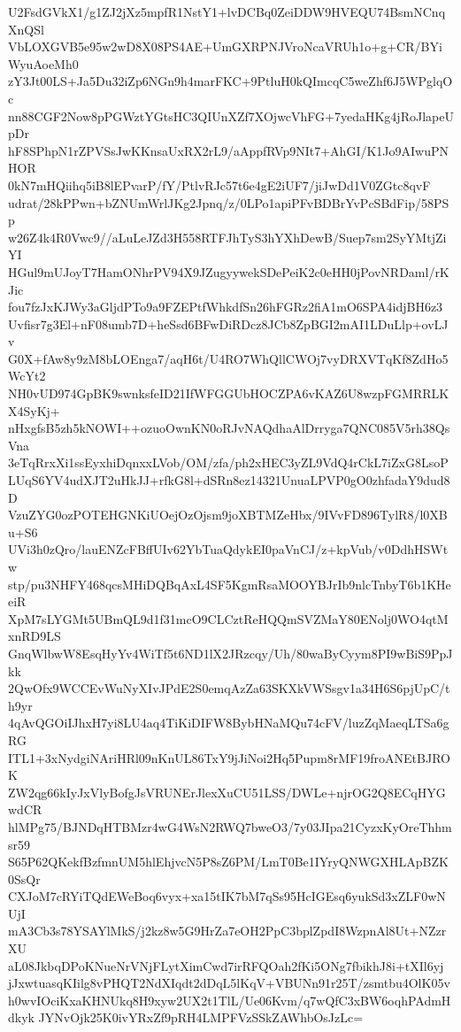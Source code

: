 U2FsdGVkX1/g1ZJ2jXz5mpfR1NstY1+lvDCBq0ZeiDDW9HVEQU74BsmNCnqXnQSl
VbLOXGVB5e95w2wD8X08PS4AE+UmGXRPNJVroNcaVRUh1o+g+CR/BYiWyuAoeMh0
zY3Jt00LS+Ja5Du32iZp6NGn9h4marFKC+9PtluH0kQImcqC5weZhf6J5WPglqOc
nn88CGF2Now8pPGWztYGtsHC3QIUnXZf7XOjwcVhFG+7yedaHKg4jRoJlapeUpDr
hF8SPhpN1rZPVSsJwKKnsaUxRX2rL9/aAppfRVp9NIt7+AhGI/K1Jo9AIwuPNHOR
0kN7mHQiihq5iB8lEPvarP/fY/PtlvRJc57t6e4gE2iUF7/jiJwDd1V0ZGtc8qvF
udrat/28kPPwn+bZNUmWrlJKg2Jpnq/z/0LPo1apiPFvBDBrYvPcSBdFip/58PSp
w26Z4k4R0Vwc9//aLuLeJZd3H558RTFJhTyS3hYXhDewB/Suep7sm2SyYMtjZiYI
HGul9mUJoyT7HamONhrPV94X9JZugyywekSDePeiK2c0eHH0jPovNRDaml/rKJic
fou7fzJxKJWy3aGljdPTo9a9FZEPtfWhkdfSn26hFGRz2fiA1mO6SPA4idjBH6z3
Uvfisr7g3El+nF08umb7D+heSsd6BFwDiRDcz8JCb8ZpBGI2mAI1LDuLlp+ovLJv
G0X+fAw8y9zM8bLOEnga7/aqH6t/U4RO7WhQllCWOj7vyDRXVTqKf8ZdHo5WcYt2
NH0vUD974GpBK9swnksfeID21IfWFGGUbHOCZPA6vKAZ6U8wzpFGMRRLKX4SyKj+
nHxgfsB5zh5kNOWI++ozuoOwnKN0oRJvNAQdhaAlDrryga7QNC085V5rh38QsVna
3eTqRrxXi1ssEyxhiDqnxxLVob/OM/zfa/ph2xHEC3yZL9VdQ4rCkL7iZxG8LsoP
LUqS6YV4udXJT2uHkJJ+rfkG8l+dSRn8ez14321UnuaLPVP0gO0zhfadaY9dud8D
VzuZYG0ozPOTEHGNKiUOejOzOjsm9joXBTMZeHbx/9IVvFD896TylR8/l0XBu+S6
UVi3h0zQro/lauENZcFBffUIv62YbTuaQdykEI0paVnCJ/z+kpVub/v0DdhHSWtw
stp/pu3NHFY468qcsMHiDQBqAxL4SF5KgmRsaMOOYBJrIb9nlcTnbyT6b1KHeeiR
XpM7sLYGMt5UBmQL9d1f31mcO9CLCztReHQQmSVZMaY80ENolj0WO4qtMxnRD9LS
GnqWlbwW8EsqHyYv4WiTf5t6ND1lX2JRzcqy/Uh/80waByCyym8PI9wBiS9PpJkk
2QwOfx9WCCEvWuNyXIvJPdE2S0emqAzZa63SKXkVWSsgv1a34H6S6pjUpC/th9yr
4qAvQGOiIJhxH7yi8LU4aq4TiKiDIFW8BybHNaMQu74cFV/luzZqMaeqLTSa6gRG
ITL1+3xNydgiNAriHRl09nKnUL86TxY9jJiNoi2Hq5Pupm8rMF19froANEtBJROK
ZW2qg66kIyJxVlyBofgJsVRUNErJlexXuCU51LSS/DWLe+njrOG2Q8ECqHYGwdCR
hlMPg75/BJNDqHTBMzr4wG4WsN2RWQ7bweO3/7y03JIpa21CyzxKyOreThhmsr59
S65P62QKekfBzfmnUM5hlEhjvcN5P8sZ6PM/LmT0Be1IYryQNWGXHLApBZK0SsQr
CXJoM7cRYiTQdEWeBoq6vyx+xa15tIK7bM7qSs95HcIGEsq6yukSd3xZLF0wNUjI
mA3Cb3s78YSAYlMkS/j2kz8w5G9HrZa7eOH2PpC3bplZpdI8WzpnAl8Ut+NZzrXU
aL08JkbqDPoKNueNrVNjFLytXimCwd7irRFQOah2fKi5ONg7fbikhJ8i+tXIl6yj
jJxwtuasqKIilg8vPHQT2NdXIqdt2dDqL5lKqV+VBUNn91r25T/zsmtbu4OlK05v
h0wvIOciKxaKHNUkq8H9xyw2UX2t1TlL/Ue06Kvm/q7wQfC3xBW6oqhPAdmHdkyk
JYNvOjk25K0ivYRxZf9pRH4LMPFVzSSkZAWhbOsJzLc=
